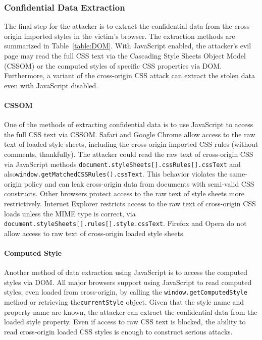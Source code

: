 \documentclass{acm_proc_article-sp}
\begin{document}
\subsubsection{Confidential Data Extraction}\label{sec:extraction}
The final step for the attacker is to extract the confidential data from the cross-origin imported styles in the victim's browser. The extraction methods are summarized in Table~\ref{table:DOM}. With JavaScript enabled, the attacker's evil page may read the full CSS text via the Cascading Style Sheets Object Model (CSSOM) or the computed styles of specific CSS properties via DOM. Furthermore, a variant of the cross-origin CSS attack can extract the stolen data even with JavaScript disabled.

\paragraph{CSSOM}
One of the methods of extracting confidential data is to use JavaScript to access the full CSS text via CSSOM. Safari and Google Chrome allow access to the raw text of loaded style sheets, including the cross-origin imported CSS rules (without comments, thankfully). The attacker could read the raw text of cross-origin CSS via JavaScript methods \texttt{document.styleSheets[].cssRules[].cssText} and also\linebreak \texttt{window.getMatchedCSSRules().cssText}. This behavior violates the same-origin policy  and can leak cross-origin data from documents with semi-valid CSS constructs. Other browsers protect access to the raw text of style sheets more restrictively. Internet Explorer restricts access to the raw text of cross-origin CSS loads unless the MIME type is correct, via \texttt{document.styleSheets[].rules[].style.cssText}. Firefox and Opera do not allow access to raw text of cross-origin loaded style sheets.

\paragraph{Computed Style}
Another method of data extraction using JavaScript is to access the computed styles via DOM. All major browsers support using JavaScript to read computed styles, even loaded from cross-origin, by calling the \texttt{window.getComputedStyle} method or retrieving the\linebreak \texttt{currentStyle} object. Given that the style name and property name are known, the attacker can extract the confidential data from the loaded style property. Even if access to raw CSS text is blocked, the ability to read cross-origin loaded CSS styles is enough to construct serious attacks.
\end{document}
